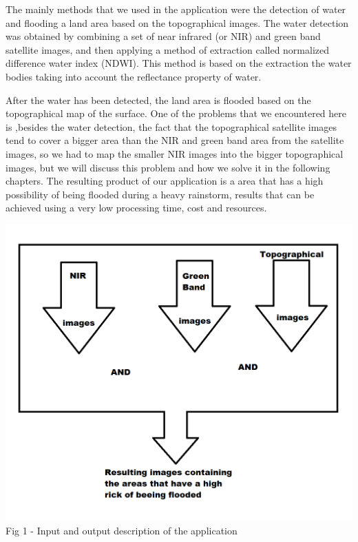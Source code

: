 \documentclass[12pt, a4paper]{report}
\begin{document}
The mainly methods that we used in the application were the detection of water and flooding a land area based on the topographical images. The water detection was obtained by combining a set of near infrared (or NIR) and green band satellite images, and then applying a method of extraction called normalized difference water index (NDWI). This method is based on the extraction the water bodies taking into account the reflectance property of water.
\par 

After the water has been detected, the land area is flooded based on the topographical map of the surface. One of the problems that we encountered here is ,besides the water detection, the fact that the topographical satellite images tend to cover a bigger area than the NIR and green band area from the satellite images, so we had to map the smaller NIR images into the bigger topographical images, but we will discuss this problem and how we solve it in the following chapters. The resulting product of our application is a area that has a high possibility of being flooded during a heavy rainstorm, results that can be achieved using a very low processing time, cost and resources.
\par 

\begin{center}
	\includegraphics[scale=0.6]{application_outline.png} 
	Fig 1 - Input and output description of the application
\end{center}
\end{document}
